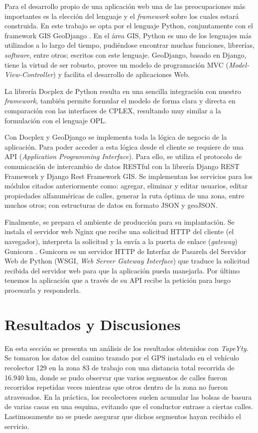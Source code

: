 \documentclass[conference]{IEEEtran}
\begin{document}
Para el desarrollo propio de una aplicación web una de las preocupaciones más importantes es la elección del lenguaje y el \textit{framework} sobre los cuales estará construida. En este trabajo se opta por el lenguaje Python, conjuntamente con el framework GIS GeoDjango \cite{GeoDjango}. En el área GIS, Python es uno de los lenguajes más utilizados a lo largo del tiempo, pudiéndose encontrar muchas funciones, librerías, \textit{software}, entre otros; escritos con este lenguaje. GeoDjango, basado en Django, tiene la virtud de ser robusto, provee un modelo de programación MVC (\textit{Model-View-Controller}) y facilita el desarrollo de aplicaciones Web. 

La librería Docplex de Python resulta en una sencilla integración con nuestro \textit{framework}, también permite formular el modelo de forma clara y directa en comparación con las interfaces de CPLEX, resultando muy similar a la formulación con el lenguaje OPL.

Con Docplex y GeoDjango se implementa toda la lógica de negocio de la aplicación. Para poder acceder a esta lógica desde el cliente se requiere de una API (\textit{Application Programming Interface}). Para ello, se utiliza el protocolo de comunicación de intercambio de datos RESTful con la librería Django REST Framework y Django Rest Framework GIS. Se implementan los servicios para los módulos citados anteriormente como: agregar, eliminar y editar usuarios, editar propiedades alfanuméricas de calles, generar la ruta óptima de una zona, entre muchos otros; con estructuras de datos en formato JSON y geoJSON.

Finalmente, se prepara el ambiente de producción para su implantación. Se instala el servidor web Nginx \cite{NGINX} que recibe una solicitud HTTP del cliente (el navegador), interpreta la solicitud y la envía a la puerta de enlace (\textit{gateway}) Gunicorn \cite{Gunicorn}. Gunicorn es un servidor HTTP de Interfaz de Pasarela del Servidor Web de Python (WSGI, \textit{Web Server Gateway Interface}) que traduce la solicitud recibida del servidor web para que la aplicación pueda manejarla. Por último tenemos la aplicación que a través de su API recibe la petición para luego procesarla y responderla.

\section{Resultados y Discusiones}

En esta sección se presenta un análisis de los resultados obtenidos con \textit{TapeYty}. Se tomaron los datos del camino trazado por el GPS instalado en el vehículo recolector 129 en la zona 83 de trabajo con una distancia total recorrida de 16.940 km, donde se pudo observar que varios segmentos de calles fueron recorridos repetidas veces mientras que otros dentro de la zona no fueron atravesados. En la práctica, los recolectores suelen acumular las bolsas de basura de varias casas en una esquina, evitando que el conductor entrase a ciertas calles. Lastimosamente no se puede asegurar que dichos segmentos hayan recibido el servicio.
\end{document}
